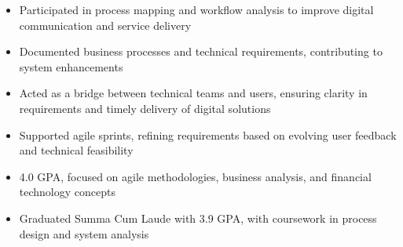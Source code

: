 \par\smallskip
\noindent
\begin{minipage}{20cm}
  \begin{minipage}{9.75cm}
    \begin{itemize}
      \item Participated in process mapping and workflow analysis to improve digital communication and service delivery
      \item Documented business processes and technical requirements, contributing to system enhancements
    \end{itemize}
  \end{minipage}
  \hfill
  \begin{minipage}{9.75cm}
    \begin{itemize}
      \item Acted as a bridge between technical teams and users, ensuring clarity in requirements and timely delivery of digital solutions
      \item Supported agile sprints, refining requirements based on evolving user feedback and technical feasibility
    \end{itemize}
  \end{minipage}
\end{minipage}

\begin{itemize}
  \item 4.0 GPA, focused on agile methodologies, business analysis, and financial technology concepts
\end{itemize}
\divider

\begin{itemize}
  \item Graduated Summa Cum Laude with 3.9 GPA, with coursework in process design and system analysis
\end{itemize}

\noindent
\begin{minipage}{20cm}
\end{minipage}


